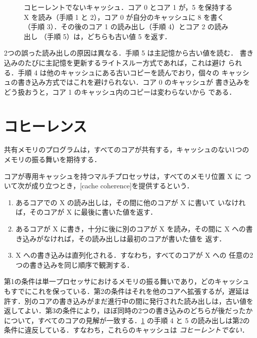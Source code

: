 \documentclass[../main.tex]{subfiles}
\begin{document}
\begin{figure}[htbp]
  \centering
  
  \caption{コヒーレントでないキャッシュ．コア 0 とコア 1 が，5 を保持する
    X を読み（手順 1 と 2），コア 0 が自分のキャッシュに 8 を書く
    （手順 3）．その後のコア 1 の読み出し（手順 4）とコア 2 の読み出し
    （手順 5）は，どちらも古い値 5 を返す．}
  \label{fig:l19-problem}
\end{figure}

2つの誤った読み出しの原因は異なる．手順 5 は主記憶から古い値を読む．
書き込みのたびに主記憶を更新するライトスルー方式であれば，これは避け
られる．手順 4 は他のキャッシュにある古いコピーを読んでおり，個々の
キャッシュの書き込み方式ではこれを避けられない．コア 0 のキャッシュが
書き込みをどう扱おうと，コア 1 のキャッシュ内のコピーは変わらないから
である．

\section{コヒーレンス}
\label{sec:l19-definition}

共有メモリのプログラムは，すべてのコアが共有する，キャッシュのない1つの
メモリの振る舞いを期待する．

\begin{definition}[キャッシュコヒーレンス]
  コアが専用キャッシュを持つマルチプロセッサは，すべてのメモリ位置 X に
  ついて次が成り立つとき，[cache coherence]を提供するという．
  \begin{enumerate}
    \item あるコアでの X の読み出しは，その間に他のコアが X に書いて
      いなければ，そのコアが X に最後に書いた値を返す．
    \item あるコアが X に書き，十分に後に別のコアが X を読み，その間に
      X への書き込みがなければ，その読み出しは最初のコアが書いた値を
      返す．
    \item X への書き込みは直列化される．すなわち，すべてのコアが X への
      任意の2つの書き込みを同じ順序で観測する．
  \end{enumerate}
\end{definition}

第1の条件は単一プロセッサにおけるメモリの振る舞いであり，どのキャッシュ
もすでにこれを保っている．第2の条件はそれを他のコアへ拡張するが，遅延は
許す．別のコアの書き込みがまだ進行中の間に発行された読み出しは，古い値を
返してよい．第3の条件により，ほぼ同時の2つの書き込みのどちらが後だったか
について，すべてのコアの見解が一致する．\cref{fig:l19-problem} の手順 4
と 5 の読み出しは第2の条件に違反している．すなわち，これらのキャッシュは
\emph{コヒーレントでない}．
\end{document}
